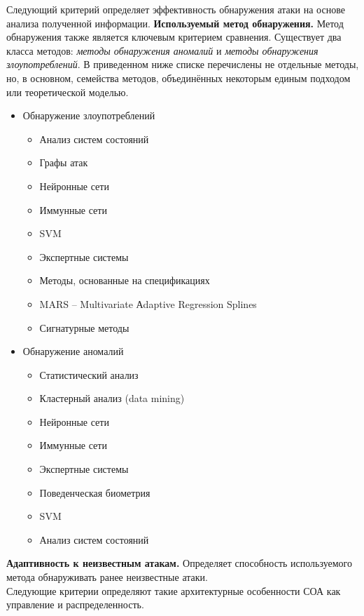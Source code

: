 Следующий критерий определяет эффективность обнаружения атаки на основе анализа полученной информации.
\textbf{Используемый метод обнаружения.} Метод обнаружения также является ключевым критерием сравнения. Существует два класса методов: \textit{методы обнаружения аномалий} и \textit{методы обнаружения злоупотреблений}. В приведенном ниже списке перечислены не отдельные методы, но, в основном, семейства методов, объединённых некоторым единым подходом или теоретической моделью. 
\begin{itemize}

\item Обнаружение злоупотреблений

\begin{itemize}

\item Анализ систем состояний
\item Графы атак
\item Нейронные сети
\item Иммунные сети
\item SVM
\item Экспертные системы
\item Методы, основанные на спецификациях
\item MARS – Multivariate Аdaptive Regression Splines
\item Сигнатурные методы

\end{itemize}

\item Обнаружение аномалий

\begin{itemize}

\item Статистический анализ
\item Кластерный анализ (data mining)
\item Нейронные сети
\item Иммунные сети
\item Экспертные системы
\item Поведенческая биометрия
\item SVM
\item Анализ систем состояний

\end{itemize}

\end{itemize} 

\textbf{Адаптивность к неизвестным атакам.} Определяет способность используемого
метода обнаруживать ранее неизвестные атаки.\\
Следующие критерии определяют такие архитектурные особенности СОА как управление и распределенность.

